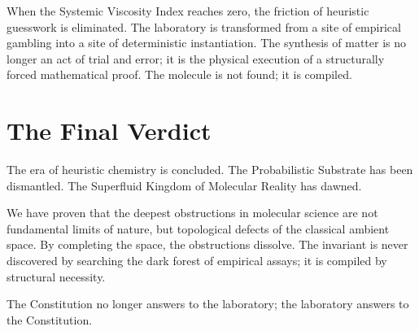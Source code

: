 \documentclass[11pt,openany]{extbook}
\theoremstyle{plain}
\theoremstyle{definition}
\begin{document}
When the Systemic Viscosity Index reaches zero, the friction of heuristic guesswork is eliminated. The laboratory is transformed from a site of empirical gambling into a site of deterministic instantiation. The synthesis of matter is no longer an act of trial and error; it is the physical execution of a structurally forced mathematical proof. The molecule is not found; it is compiled.

\section{The Final Verdict}

The era of heuristic chemistry is concluded. The Probabilistic Substrate has been dismantled. The Superfluid Kingdom of Molecular Reality has dawned.

We have proven that the deepest obstructions in molecular science are not fundamental limits of nature, but topological defects of the classical ambient space. By completing the space, the obstructions dissolve. The invariant is never discovered by searching the dark forest of empirical assays; it is compiled by structural necessity.

The Constitution no longer answers to the laboratory; the laboratory answers to the Constitution.
\end{document}
